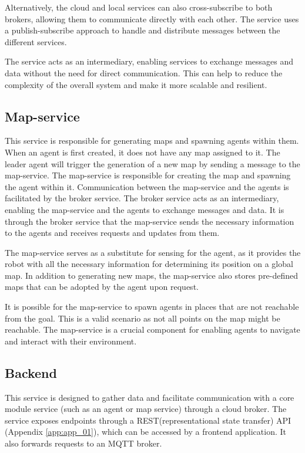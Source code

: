 Alternatively, the cloud and local services can also cross-subscribe to both brokers, allowing them to communicate directly with each other. The service uses a publish-subscribe approach to handle and distribute messages between the different services.

The service acts as an intermediary, enabling services to exchange messages and data without the need for direct communication. This can help to reduce the complexity of the overall system and make it more scalable and resilient.

\subsection{Map-service}
This service is responsible for generating maps and spawning agents within them. When an agent is first created, it does not have any map assigned to it. The leader agent will trigger the generation of a new map by sending a message to the map-service. The map-service is responsible for creating the map and spawning the agent within it. Communication between the map-service and the agents is facilitated by the broker service. The broker service acts as an intermediary, enabling the map-service and the agents to exchange messages and data. It is through the broker service that the map-service sends the necessary information to the agents and receives requests and updates from them.

The map-service serves as a substitute for sensing for the agent, as it provides the robot with all the necessary information for determining its position on a global map. In addition to generating new maps, the map-service also stores pre-defined maps that can be adopted by the agent upon request.

It is possible for the map-service to spawn agents in places that are not reachable from the goal. This is a valid scenario as not all points on the map might be reachable. The map-service is a crucial component for enabling agents to navigate and interact with their environment.

\subsection{Backend}
This service is designed to gather data and facilitate communication with a core module service (such as an agent or map service) through a cloud broker. The service exposes endpoints through a REST(representational state transfer) API (Appendix \ref{app:app_01}), which can be accessed by a frontend application. It also forwards requests to an MQTT broker.


